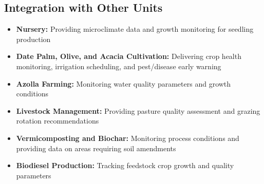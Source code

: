 \subsection{Integration with Other Units}
\begin{itemize}
    \item \textbf{Nursery:} Providing microclimate data and growth monitoring for seedling production
    
    \item \textbf{Date Palm, Olive, and Acacia Cultivation:} Delivering crop health monitoring, irrigation scheduling, and pest/disease early warning
    
    \item \textbf{Azolla Farming:} Monitoring water quality parameters and growth conditions
    
    \item \textbf{Livestock Management:} Providing pasture quality assessment and grazing rotation recommendations
    
    \item \textbf{Vermicomposting and Biochar:} Monitoring process conditions and providing data on areas requiring soil amendments
    
    \item \textbf{Biodiesel Production:} Tracking feedstock crop growth and quality parameters
\end{itemize} 
